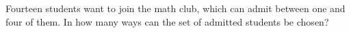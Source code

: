 Fourteen students want to join the math club, which can admit between one and four of them. In how many ways can the set of admitted students be chosen?
